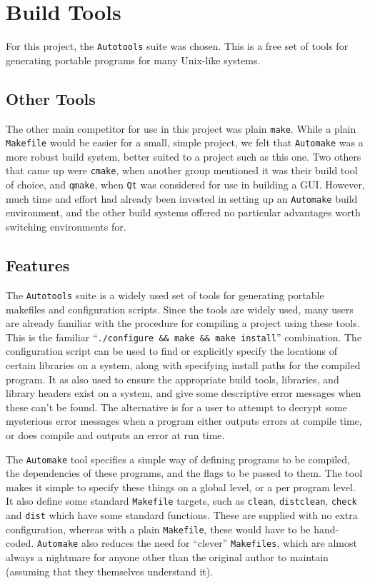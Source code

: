 \section{Build Tools}
For this project, the \texttt{Autotools} suite was chosen.
This is a free set of tools for generating portable programs for many
Unix-like systems.

\subsection{Other Tools}
The other main competitor for use in this project was plain \texttt{make}.
While a plain \texttt{Makefile} would be easier for a small, simple project,
we felt that \texttt{Automake} was a more robust build system, better suited
to a project such as this one.
Two others that came up were \texttt{cmake}, when another group mentioned it
was their build tool of choice, and \texttt{qmake}, when \texttt{Qt} was
considered for use in building a GUI.
However, much time and effort had already been invested in setting up
an \texttt{Automake} build environment, and the other build systems offered
no particular advantages worth switching environments for.

\subsection{Features}
The \texttt{Autotools} suite is a widely used set of tools for generating
portable makefiles and configuration scripts.
Since the tools are widely used, many users are already familiar with
the procedure for compiling a project using these tools.
This is the familiar ``\texttt{./configure \&\& make \&\& make install}''
combination.
The configuration script can be used to find or explicitly specify the
locations of certain libraries on a system, along with specifying install
paths for the compiled program.
It as also used to ensure the appropriate build tools, libraries, and
library headers exist on a system, and give some descriptive error
messages when these can't be found.
The alternative is for a user to attempt to decrypt some mysterious
error messages when a program either outputs errors at compile time, or does
compile and outputs an error at run time.

The \texttt{Automake} tool specifies a simple way of defining programs to be
compiled, the dependencies of these programs, and the flags to be passed
to them.
The tool makes it simple to specify these things on a global level, or a
per program level.
It also define some standard \texttt{Makefile} targets, such as
\texttt{clean}, \texttt{distclean}, \texttt{check} and \texttt{dist}
which have some standard functions.
These are supplied with no extra configuration, whereas with a plain
\texttt{Makefile}, these would have to be hand-coded.
\texttt{Automake} also reduces the need for ``clever'' \texttt{Makefiles},
which are almost always a nightmare for anyone other than the original
author to maintain (assuming that they themselves understand it).

